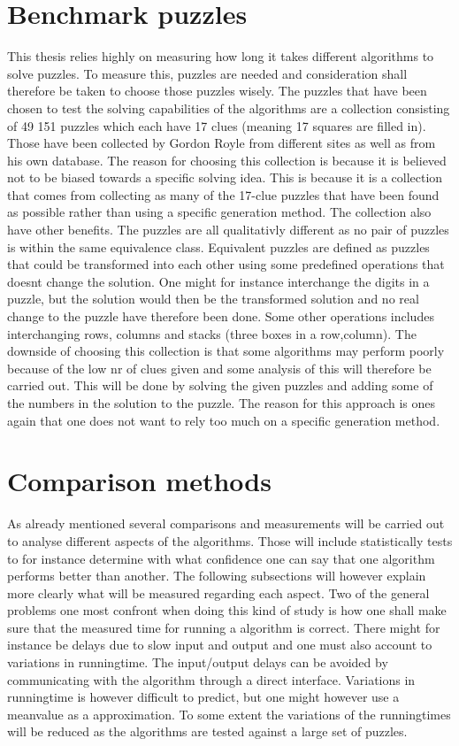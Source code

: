 \documentclass[a4paper,11pt]{kth-mag}
\begin{document}
\section{Benchmark puzzles}
This thesis relies highly on measuring how long it takes different algorithms to solve puzzles. To measure this, puzzles are needed and consideration shall therefore be taken to choose those puzzles wisely. The puzzles that have been chosen to test the solving capabilities of the algorithms are a collection consisting of 49 151 puzzles which each have 17 clues (meaning 17 squares are filled in). \cite{database} Those have been collected by Gordon Royle from different sites as well as from his own database. The reason for choosing this collection is because it is believed not to be biased towards a specific solving idea. This is because it is a collection that comes from collecting as many of the 17-clue puzzles that have been found as possible rather than using a specific generation method. The collection also have other benefits. The puzzles are all qualitativly different as no pair of puzzles is within the same equivalence class. Equivalent puzzles are defined as puzzles that could be transformed into each other using some predefined operations that doesnt change the solution. One might for instance interchange the digits in a puzzle, but the solution would then be the transformed solution and no real change to the puzzle have therefore been done. Some other operations includes interchanging rows, columns and stacks (three boxes in a row,column). The downside of choosing this collection is that some algorithms may perform poorly because of the low nr of clues given and some analysis of this will therefore be carried out. This will be done by solving the given puzzles and adding some of the numbers in the solution to the puzzle. The reason for this approach is ones again that one does not want to rely too much on a specific generation method.

\section{Comparison methods}
As already mentioned several comparisons and measurements will be carried out to 
analyse different aspects of the algorithms. Those will include statistically tests 
to for instance determine with what confidence one can say that one algorithm performs 
better than another. 
The following subsections will however explain more clearly what will be measured 
regarding each aspect. 
Two of the general problems one most confront when doing this kind of study is how one 
shall make sure that the measured time for  running a algorithm is correct. 
There might for instance be delays due to slow input and output and one must also account 
to variations in runningtime. 
The input/output delays can be avoided by communicating with the algorithm through a 
direct interface. 
Variations in runningtime is however difficult to predict, but one might however use a 
meanvalue as a approximation. 
To some extent the variations of the runningtimes will be reduced as the algorithms are tested against a large set of puzzles.  
\end{document}
